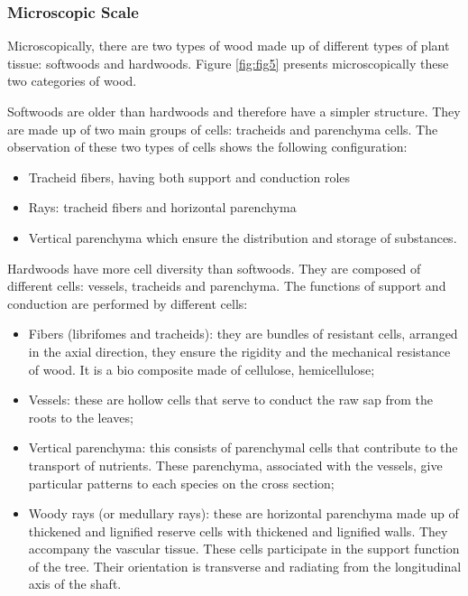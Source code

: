\subsubsection{Microscopic Scale}

Microscopically, there are two types of wood made up of different types of plant tissue: softwoods and hardwoods. Figure \ref{fig:fig5} presents microscopically these two categories of wood.

Softwoods are older than hardwoods and therefore have a simpler structure. They are made up of two main groups of cells: tracheids and parenchyma cells. The observation of these two types of cells shows the following configuration:

\begin{itemize}
	\item Tracheid fibers, having both support and conduction roles
	\item Rays: tracheid fibers and horizontal parenchyma
	\item Vertical parenchyma which ensure the distribution and storage of substances.
\end{itemize}

Hardwoods have more cell diversity than softwoods. They are composed of different cells: vessels, tracheids and parenchyma. The functions of support and conduction are performed by different cells:

\begin{itemize}
	\item Fibers (librifomes and tracheids): they are bundles of resistant cells, arranged in the axial direction, they ensure the rigidity and the mechanical resistance of wood. It is a bio composite made of cellulose, hemicellulose;
	\item Vessels: these are hollow cells that serve to conduct the raw sap from the roots to the leaves;
	\item Vertical parenchyma: this consists of parenchymal cells that contribute to the transport of nutrients. These parenchyma, associated with the vessels, give particular patterns to each species on the cross section;
	\item Woody rays (or medullary rays): these are horizontal parenchyma made up of thickened and lignified reserve cells with thickened and lignified walls. They accompany the vascular tissue. These cells participate in the support function of the tree. Their orientation is transverse and radiating from the longitudinal axis of the shaft.
\end{itemize}


